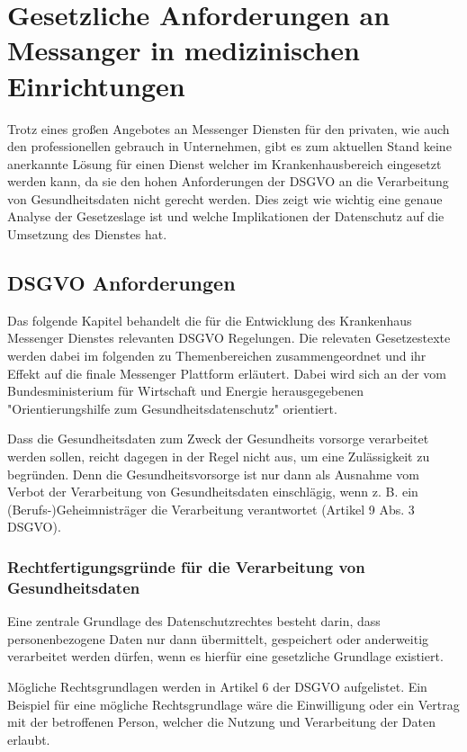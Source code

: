 \chapter{Gesetzliche Anforderungen an Messanger in medizinischen Einrichtungen}\label{chapter:ganforderungen}
Trotz eines großen Angebotes an Messenger Diensten für den privaten, wie auch den professionellen gebrauch in Unternehmen, gibt es zum aktuellen Stand keine anerkannte Lösung für einen Dienst welcher im Krankenhausbereich eingesetzt werden kann, da sie den hohen Anforderungen der DSGVO an die Verarbeitung von Gesundheitsdaten nicht gerecht werden. Dies zeigt wie wichtig eine genaue Analyse der Gesetzeslage ist und welche Implikationen der Datenschutz auf die Umsetzung des Dienstes hat.

\section{DSGVO Anforderungen}\label{section:dsgvo}
Das folgende Kapitel behandelt die für die Entwicklung des Krankenhaus Messenger Dienstes relevanten DSGVO Regelungen. Die relevaten Gesetzestexte werden dabei im folgenden zu Themenbereichen zusammengeordnet und ihr Effekt auf die finale Messenger Plattform erläutert. Dabei wird sich an der vom Bundesministerium für Wirtschaft und Energie herausgegebenen "Orientierungshilfe zum Gesundheitsdatenschutz" orientiert.

Dass die Gesundheitsdaten zum Zweck der Gesundheits vorsorge verarbeitet werden sollen, reicht dagegen in der Regel nicht aus, um eine Zulässigkeit zu begründen. Denn die Gesundheitsvorsorge ist nur dann als Ausnahme vom Verbot der Verarbeitung von Gesundheitsdaten einschlägig, wenn z. B. ein (Berufs-)Geheimnisträger die Verarbeitung verantwortet (Artikel 9 Abs. 3 DSGVO).

\subsection{Rechtfertigungsgründe für die Verarbeitung von Gesundheitsdaten}\label{subsection:rfdvvg}
Eine zentrale Grundlage des Datenschutzrechtes besteht darin, dass personenbezogene Daten nur dann übermittelt, gespeichert oder anderweitig verarbeitet werden dürfen, wenn es hierfür eine gesetzliche Grundlage existiert.

Mögliche Rechtsgrundlagen werden in Artikel 6 der DSGVO aufgelistet. Ein Beispiel für eine mögliche Rechtsgrundlage wäre die Einwilligung oder ein Vertrag mit der betroffenen Person, welcher die Nutzung und Verarbeitung der Daten erlaubt.

